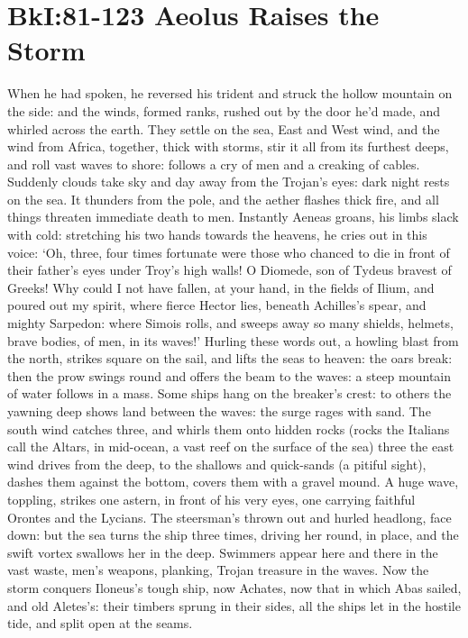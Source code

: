 \documentclass[12pt, usletter]{article}
\begin{document}
\section*{BkI:81-123 Aeolus Raises the Storm}
When he had spoken, he reversed his trident and struck
the hollow mountain on the side: and the winds, formed ranks,
rushed out by the door he’d made, and whirled across the earth.
They settle on the sea, East and West wind,
and the wind from Africa, together, thick with storms,
stir it all from its furthest deeps, and roll vast waves to shore:
follows a cry of men and a creaking of cables.
Suddenly clouds take sky and day away
from the Trojan’s eyes: dark night rests on the sea.
It thunders from the pole, and the aether flashes thick fire,
and all things threaten immediate death to men.
Instantly Aeneas groans, his limbs slack with cold:
stretching his two hands towards the heavens,
he cries out in this voice: ‘Oh, three, four times fortunate
were those who chanced to die in front of their father’s eyes
under Troy’s high walls! O Diomede, son of Tydeus
bravest of Greeks! Why could I not have fallen, at your hand,
in the fields of Ilium, and poured out my spirit,
where fierce Hector lies, beneath Achilles’s spear,
and mighty Sarpedon: where Simois rolls, and sweeps away
so many shields, helmets, brave bodies, of men, in its waves!’
Hurling these words out, a howling blast from the north,
strikes square on the sail, and lifts the seas to heaven:
the oars break: then the prow swings round and offers
the beam to the waves: a steep mountain of water follows in a mass.
Some ships hang on the breaker’s crest: to others the yawning deep
shows land between the waves: the surge rages with sand.
The south wind catches three, and whirls them onto hidden rocks
(rocks the Italians call the Altars, in mid-ocean,
a vast reef on the surface of the sea) three the east wind drives
from the deep, to the shallows and quick-sands (a pitiful sight),
dashes them against the bottom, covers them with a gravel mound.
A huge wave, toppling, strikes one astern, in front of his very eyes,
one carrying faithful Orontes and the Lycians.
The steersman’s thrown out and hurled headlong, face down:
but the sea turns the ship three times, driving her round,
in place, and the swift vortex swallows her in the deep.
Swimmers appear here and there in the vast waste,
men’s weapons, planking, Trojan treasure in the waves.
Now the storm conquers Iloneus’s tough ship, now Achates,
now that in which Abas sailed, and old Aletes’s:
their timbers sprung in their sides, all the ships
let in the hostile tide, and split open at the seams.
\end{document}
